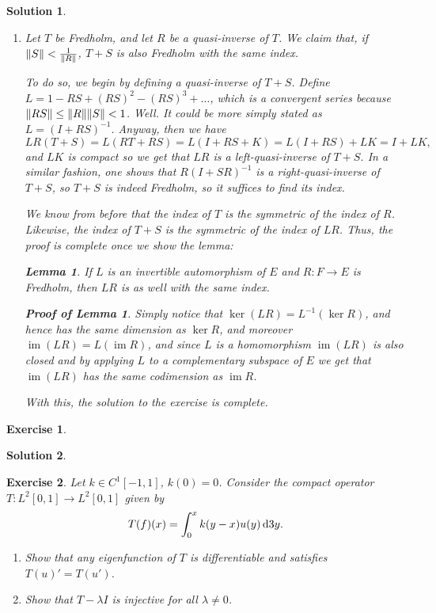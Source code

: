 \documentclass{article}
\newtheorem{lemma}{Lemma}
\newtheorem{ex}{Exercise}
\theoremstyle{nonumberplain}
\newtheorem{sol}{Solution}
\newtheorem{lemmaproof}{Proof of Lemma}
\DeclareMathOperator{\image}{im}
\DeclarePairedDelimiter{\Norm}{\lVert}{\rVert}
\begin{document}
\begin{sol}
\begin{enumerate}
\item Let $T$ be Fredholm, and let $R$ be a quasi-inverse of $T$. We claim that, if $\Norm S < \frac1{\Norm R}$, $T + S$ is also Fredholm with the same index.

To do so, we begin by defining a quasi-inverse of $T+S$. Define $L = 1 - RS + (RS)^2 - (RS)^3 + \dots$, which is a convergent series because $\Norm{RS} \leq \Norm R \Norm S < 1$. Well. It could be more simply stated as $L = (I + RS)^{-1}$. Anyway, then we have
\begin{equation}
LR(T+S) = L(RT + RS) = L(I + RS + K) = L(I + RS) + LK = I + LK,
\end{equation}
and $LK$ is compact so we get that $LR$ is a left-quasi-inverse of $T + S$. In a similar fashion, one shows that $R(I + SR)^{-1}$ is a right-quasi-inverse of $T+S$, so $T+S$ is indeed Fredholm, so it suffices to find its index.

We know from before that the index of $T$ is the symmetric of the index of $R$. Likewise, the index of $T+S$ is the symmetric of the index of $LR$. Thus, the proof is complete once we show the lemma:

\begin{lemma}
If $L$ is an invertible automorphism of $E$ and $R \colon F \to E$ is Fredholm, then $LR$ is as well with the same index.
\end{lemma}

\begin{lemmaproof}
Simply notice that $\ker(LR) = L^{-1}(\ker R)$, and hence has the same dimension as $\ker R$, and moreover $\image(LR) = L(\image R)$, and since $L$ is a homomorphism $\image(LR)$ is also closed and by applying $L$ to a complementary subspace of $E$ we get that $\image(LR)$ has the same codimension as $\image R$.
\end{lemmaproof}

With this, the solution to the exercise is complete.
\end{enumerate}
\end{sol}

\begin{ex}
\end{ex}

\begin{sol}
\end{sol}



\begin{ex}
Let $k \in C^1[-1,1]$, $k(0) = 0$. Consider the compact operator $T \colon L^2[0,1] \to L^2[0,1]$ given by
\begin{equation}
T(f)(x) = \int_0^x k(y-x) u(y) \dl3 y.
\end{equation}
\begin{enumerate}
\item Show that any eigenfunction of $T$ is differentiable and satisfies $T(u)' = T(u')$.
\item Show that $T-\lambda I$ is injective for all $\lambda \neq 0$.
\end{enumerate}
\end{ex}
\end{document}
